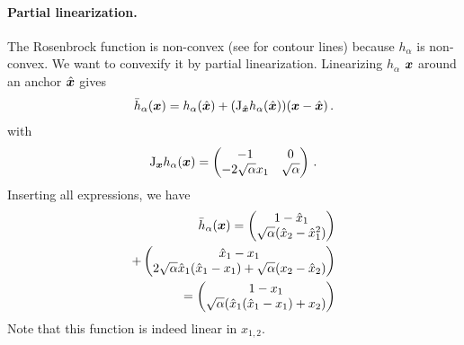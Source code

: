 \begin{example}
  \paragraph{Partial linearization.}
  The Rosenbrock function is non-convex (see  for contour lines) because $h_{\alpha}$ is non-convex.
  We want to convexify it by partial linearization.
  Linearizing $h_{\alpha}$ \wrt ${\bm{x}}$ around an anchor $\hat{{\bm{x}}}$ gives
  \begin{align*}
    \bar{h}_{\alpha}({\bm{x}}) = h_{\alpha}(\hat{{\bm{x}}}) + (\mathrm{J}_{\hat{{\bm{x}}}}h_{\alpha}(\hat{{\bm{x}}})) ({\bm{x}} - \hat{{\bm{x}}})\,.
  \end{align*}
  with
  \begin{align*}
    \mathrm{J}_{{\bm{x}}}h_{\alpha}({\bm{x}})
    =
    \begin{pmatrix}
      -1                   & 0             \\
      -2 \sqrt{\alpha} x_1 & \sqrt{\alpha}
    \end{pmatrix}\,.
  \end{align*}
  Inserting all expressions, we have
  \begin{align*}
    \bar{h}_{\alpha}({\bm{x}})
    =
    \begin{pmatrix}
      1 - \hat{x}_1 \\
      \sqrt{\alpha} (\hat{x}_2 - \hat{x}_1^2)
    \end{pmatrix}
    \\
    +
    \begin{pmatrix}
      \hat{x}_1 - x_1 \\
      2 \sqrt{\alpha} \hat{x}_1 (\hat{x}_1 - x_1) + \sqrt{\alpha} (x_2 - \hat{x}_2)
    \end{pmatrix}
    \\
    =
    \begin{pmatrix}
      1 - x_1
      \\
      \sqrt{\alpha} (\hat{x}_1 (\hat{x}_1 - x_1) +  x_2 )
    \end{pmatrix}
  \end{align*}
  Note that this function is indeed linear in $x_{1,2}$.


\end{example}
